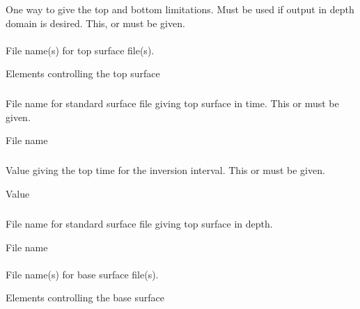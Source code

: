 \subsubsection{} 
 \slist
   \item \Description One way to give the top and bottom limitations. Must be used if output in depth domain is desired. This,  or  must be given.
   \item \Argument
   \item \Default
 \elist

\paragraph{\necessary} 
 \slist
   \item \Description File name(s) for top surface file(s).
   \item \Argument Elements controlling the top surface
   \item \Default
 \elist

\subparagraph{} 
 \slist
   \item \Description File name for standard surface file giving top surface in time. This or  must be given.
   \item \Argument File name
   \item \Default
 \elist

\subparagraph{} 
 \slist
   \item \Description Value giving the top time for the inversion interval. This or  must be given.
   \item \Argument Value
   \item \Default
 \elist

 \subparagraph{} 
 \slist
   \item \Description File name for standard surface file giving top surface in depth.
   \item \Argument File name
   \item \Default
 \elist
 
\paragraph{\necessary} 
 \slist
   \item \Description File name(s) for base surface file(s).
   \item \Argument Elements controlling the base surface
   \item \Default
 \elist

